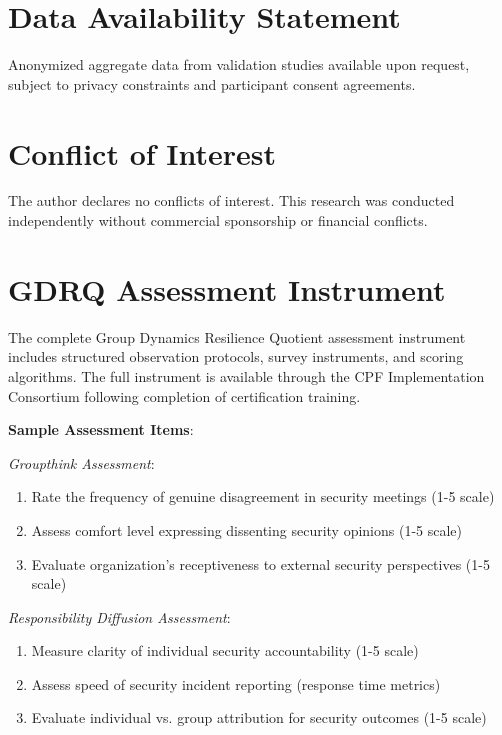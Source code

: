 \documentclass[11pt,a4paper]{article}
\begin{document}
\section*{Data Availability Statement}

Anonymized aggregate data from validation studies available upon request, subject to privacy constraints and participant consent agreements.

\section*{Conflict of Interest}

The author declares no conflicts of interest. This research was conducted independently without commercial sponsorship or financial conflicts.

\appendix

\section{GDRQ Assessment Instrument}
\label{app:gdrq_instrument}

The complete Group Dynamics Resilience Quotient assessment instrument includes structured observation protocols, survey instruments, and scoring algorithms. The full instrument is available through the CPF Implementation Consortium following completion of certification training.

\textbf{Sample Assessment Items}:

\textit{Groupthink Assessment}:
\begin{enumerate}
\item Rate the frequency of genuine disagreement in security meetings (1-5 scale)
\item Assess comfort level expressing dissenting security opinions (1-5 scale)  
\item Evaluate organization's receptiveness to external security perspectives (1-5 scale)
\end{enumerate}

\textit{Responsibility Diffusion Assessment}:
\begin{enumerate}
\item Measure clarity of individual security accountability (1-5 scale)
\item Assess speed of security incident reporting (response time metrics)
\item Evaluate individual vs. group attribution for security outcomes (1-5 scale)
\end{enumerate}
\end{document}
